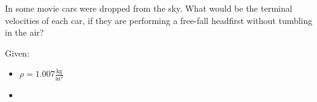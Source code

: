 
In some movie cars were dropped from the sky.
What would be the terminal velocities of each car, if they are
performing a free-fall headfirst without tumbling in the air?

\bigbreak Given:
\begin{itemize}
    \item $\rho = 1.007 \frac{\text{kg}}{\text{m}^3}$
    \item 
\end{itemize}

